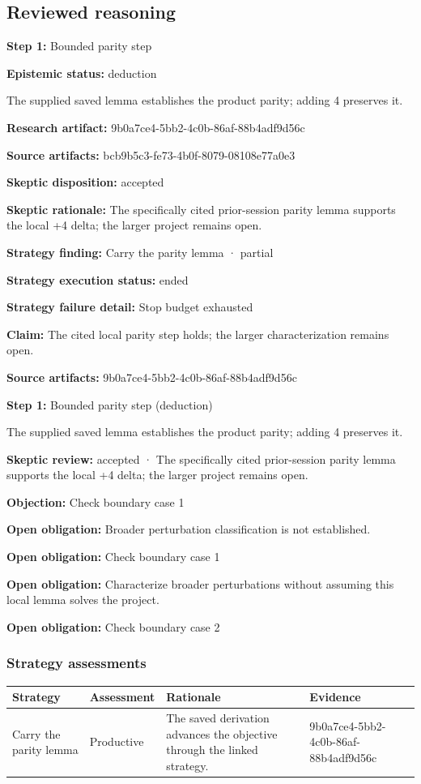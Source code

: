 \documentclass[11pt]{article}
\begin{document}
\subsection{Reviewed reasoning}
\textbf{Step 1:} Bounded parity step\par
\textbf{Epistemic status:} deduction\par
The supplied saved lemma establishes the product parity; adding 4 preserves it.\par
\textbf{Research artifact:} 9b0a7ce4-5bb2-4c0b-86af-88b4adf9d56c\par
\textbf{Source artifacts:} bcb9b5c3-fe73-4b0f-8079-08108e77a0e3\par
\textbf{Skeptic disposition:} accepted\par
\textbf{Skeptic rationale:} The specifically cited prior-session parity lemma supports the local +4 delta; the larger project remains open.\par
\textbf{Strategy finding:} Carry the parity lemma · partial\par
\textbf{Strategy execution status:} ended\par
\textbf{Strategy failure detail:} Stop budget exhausted\par
\textbf{Claim:} The cited local parity step holds; the larger characterization remains open.\par
\textbf{Source artifacts:} 9b0a7ce4-5bb2-4c0b-86af-88b4adf9d56c\par
\textbf{Step 1:} Bounded parity step (deduction)\par
The supplied saved lemma establishes the product parity; adding 4 preserves it.\par
\textbf{Skeptic review:} accepted · The specifically cited prior-session parity lemma supports the local +4 delta; the larger project remains open.\par
\textbf{Objection:} Check boundary case 1\par
\textbf{Open obligation:} Broader perturbation classification is not established.\par
\textbf{Open obligation:} Check boundary case 1\par
\textbf{Open obligation:} Characterize broader perturbations without assuming this local lemma solves the project.\par
\textbf{Open obligation:} Check boundary case 2\par
\subsubsection*{Strategy assessments}
\begin{longtable}{>{\raggedright\arraybackslash}p{.16\linewidth}>{\raggedright\arraybackslash}p{.15\linewidth}>{\raggedright\arraybackslash}p{.40\linewidth}>{\raggedright\arraybackslash}p{.17\linewidth}}
\toprule Strategy & Assessment & Rationale & Evidence \\
\midrule\endhead
Carry the parity lemma & Productive & The saved derivation advances the objective through the linked strategy. & 9b0a7ce4-5bb2-4c0b-86af-88b4adf9d56c \\
\bottomrule
\end{longtable}
\end{document}
